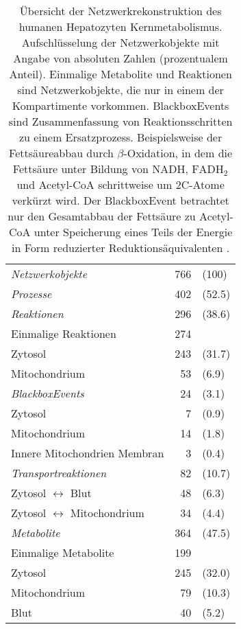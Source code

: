 \begin{table}[h]
\begin{tabular}{l r l}
\toprule
\textit{Netzwerkobjekte} & 766 & \footnotesize{(100)}\\
\textit{Prozesse} & 402 & \footnotesize{(52.5)}\\
\midrule
\textit{Reaktionen} & 296 & \footnotesize{(38.6)}\\
\hspace*{5mm}Einmalige Reaktionen & 274 & \\
\hspace*{5mm}Zytosol & 243 & \footnotesize{(31.7)}\\
\hspace*{5mm}Mitochondrium & 53 & \footnotesize{(6.9)}\\
\midrule
\textit{BlackboxEvents} & 24 & \footnotesize{(3.1)}\\
\hspace*{5mm}Zytosol & 7 & \footnotesize{(0.9)}\\
\hspace*{5mm}Mitochondrium & 14 &\footnotesize{(1.8)}\\
\hspace*{5mm}Innere Mitochondrien Membran & 3 & \footnotesize{(0.4)}\\
\midrule
\textit{Transportreaktionen} & 82 & \footnotesize{(10.7)}\\
\hspace*{5mm}Zytosol $\leftrightarrow$ Blut & 48 & \footnotesize{(6.3)} \\
\hspace*{5mm}Zytosol $\leftrightarrow$ Mitochondrium & 34 & \footnotesize{(4.4)}\\
\midrule
\textit{Metabolite} & 364 & \footnotesize{(47.5)}\\
\hspace*{5mm}Einmalige Metabolite & 199 & \\
\hspace*{5mm}Zytosol & 245 & \footnotesize{(32.0)}\\
\hspace*{5mm}Mitochondrium & 79 & \footnotesize{(10.3)}\\
\hspace*{5mm}Blut & 40 & \footnotesize{(5.2)}\\
\bottomrule
\end{tabular} 
\label{tab: reconstruction}
\caption{Übersicht der Netzwerkrekonstruktion des humanen Hepatozyten Kernmetabolismus. Aufschlüsselung der Netzwerkobjekte mit Angabe von absoluten Zahlen (prozentualem Anteil). Einmalige Metabolite und Reaktionen sind Netzwerkobjekte, die nur in einem der Kompartimente vorkommen. BlackboxEvents sind Zusammenfassung von Reaktionsschritten zu einem Ersatzprozess. Beispielsweise der Fettsäureabbau durch $\beta$-Oxidation, in dem die Fettsäure unter Bildung von $\text{NADH}$, $\text{FADH}_2$ und Acetyl-CoA schrittweise um 2C-Atome verkürzt wird. Der BlackboxEvent betrachtet nur den Gesamtabbau der Fettsäure zu Acetyl-CoA unter Speicherung eines Teils der Energie in Form reduzierter Reduktionsäquivalenten .}
\end{table}
\normalsize

